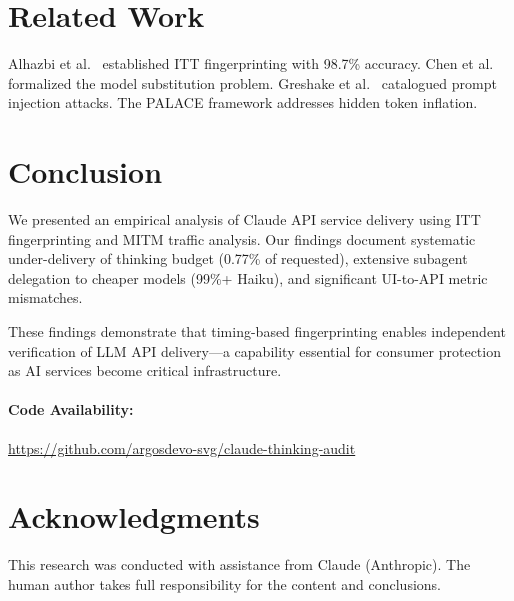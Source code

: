 \documentclass[11pt,a4paper]{article}
\begin{document}
\section{Related Work}

Alhazbi et al.\ \cite{llms-rhythm} established ITT fingerprinting with 98.7\% accuracy. Chen et al.\ \cite{model-substitution} formalized the model substitution problem. Greshake et al.\ \cite{greshake2023} catalogued prompt injection attacks. The PALACE framework \cite{palace} addresses hidden token inflation.

\section{Conclusion}

We presented an empirical analysis of Claude API service delivery using ITT fingerprinting and MITM traffic analysis. Our findings document systematic under-delivery of thinking budget (0.77\% of requested), extensive subagent delegation to cheaper models (99\%+ Haiku), and significant UI-to-API metric mismatches.

These findings demonstrate that timing-based fingerprinting enables independent verification of LLM API delivery---a capability essential for consumer protection as AI services become critical infrastructure.

\paragraph{Code Availability:} \url{https://github.com/argosdevo-svg/claude-thinking-audit}

\section*{Acknowledgments}

This research was conducted with assistance from Claude (Anthropic). The human author takes full responsibility for the content and conclusions.
\end{document}
